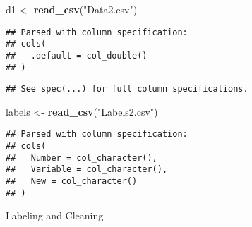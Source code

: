 \documentclass[]{article}
\newenvironment{Shaded}{\begin{snugshade}}{\end{snugshade}}
\newcommand{\DecValTok}[1]{\textcolor[rgb]{0.00,0.00,0.81}{#1}}
\newcommand{\KeywordTok}[1]{\textcolor[rgb]{0.13,0.29,0.53}{\textbf{#1}}}
\newcommand{\NormalTok}[1]{#1}
\newcommand{\OperatorTok}[1]{\textcolor[rgb]{0.81,0.36,0.00}{\textbf{#1}}}
\newcommand{\OtherTok}[1]{\textcolor[rgb]{0.56,0.35,0.01}{#1}}
\newcommand{\StringTok}[1]{\textcolor[rgb]{0.31,0.60,0.02}{#1}}
\begin{document}
\begin{Shaded}
\begin{Highlighting}[]
\NormalTok{d1 <-}\StringTok{ }\KeywordTok{read_csv}\NormalTok{(}\StringTok{"Data2.csv"}\NormalTok{)}
\end{Highlighting}
\end{Shaded}

\begin{verbatim}
## Parsed with column specification:
## cols(
##   .default = col_double()
## )
\end{verbatim}

\begin{verbatim}
## See spec(...) for full column specifications.
\end{verbatim}

\begin{Shaded}
\begin{Highlighting}[]
\NormalTok{labels <-}\StringTok{ }\KeywordTok{read_csv}\NormalTok{(}\StringTok{"Labels2.csv"}\NormalTok{)}
\end{Highlighting}
\end{Shaded}

\begin{verbatim}
## Parsed with column specification:
## cols(
##   Number = col_character(),
##   Variable = col_character(),
##   New = col_character()
## )
\end{verbatim}

Labeling and Cleaning

\begin{Shaded}
\end{Shaded}
\end{document}
